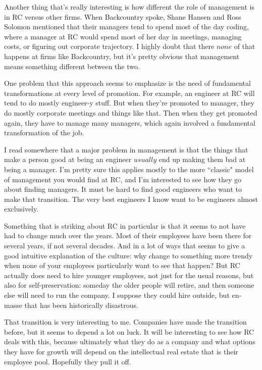 \documentclass[a4paper]{article}
\begin{document}
Another thing that's really interesting is how different the role of management is in RC versus other firms. When Backcountry spoke, Shane Hansen and Ross Solomon mentioned that their managers tend to spend most of the day coding, where a manager at RC would spend most of her day in meetings, managing costs, or figuring out corporate trajectory. I highly doubt that there $\textit{none}$ of that happens at firms like Backcountry, but it's pretty obvious that management means something different between the two.

One problem that this approach seems to emphasize is the need of fundamental transformations at every level of promotion. For example, an engineer at RC will tend to do mostly engineer-y stuff. But when they're promoted to manager, they do mostly corporate meetings and things like that. Then when they get promoted again, they have to manage many managers, which again involved a fundamental transformation of the job.

I read somewhere that a major problem in management is that the things that make a person good at being an engineer $\textit{usually}$ end up making them bad at being a manager. I'm pretty sure this applies mostly to the more ``classic" model of management you would find at RC, and I'm interested to see how they go about finding managers. It must be hard to find good engineers who want to make that transition. The very best engineers I know want to be engineers almost exclusively.

Something that is striking about RC in particular is that it seems to not have had to change much over the years. Most of their employees have been there for several years, if not several decades. And in a lot of ways that seems to give a good intuitive explanation of the culture: why change to something more trendy when none of your employees particularly want to see that happen? But RC actually does need to hire younger employees, not just for the usual reasons, but also for self-preservation: someday the older people will retire, and then someone else will need to run the company. I suppose they could hire outside, but en-masse that has been historically disastrous.

That transition is very interesting to me. Companies have made the transition before, but it seems to depend a lot on luck. It will be interesting to see how RC deals with this, because ultimately what they do as a company and what options they have for growth will depend on the intellectual real estate that is their employee pool. Hopefully they pull it off.
\end{document}
